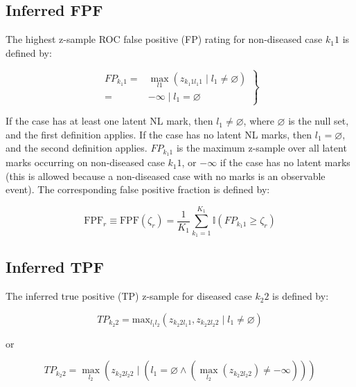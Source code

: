\documentclass[
]{book}
\begin{document}
\hypertarget{inferred-fpf}{%
\subsection{Inferred FPF}\label{inferred-fpf}}

The highest z-sample ROC false positive (FP) rating for non-diseased case \(k_1 1\) is defined by:

\begin{equation}
\left.
\begin{aligned}
FP_{k_1 1}=&\max_{l1} \left ( z_{k_1 1 l_1 1 } \mid l_1 \neq \varnothing \right ) \\
=& -\infty \mid l_1 = \varnothing  
 \end{aligned}
\right \}
\label{eq:empirical-FP}
\end{equation}

If the case has at least one latent NL mark, then \(l_1 \neq \varnothing\), where \(\varnothing\) is the null set, and the first definition applies. If the case has no latent NL marks, then \(l_1 = \varnothing\), and the second definition applies. \(FP_{k_1 1}\) is the maximum z-sample over all latent marks occurring on non-diseased case \(k_1 1\), or \(-\infty\) if the case has no latent marks (this is allowed because a non-diseased case with no marks is an observable event). The corresponding false positive fraction is defined by:

\begin{equation}
\text{FPF}_r \equiv \text{FPF} \left ( \zeta_r \right ) = \frac{1}{K_1} \sum_{k_1=1}^{K_1} \mathbb{I} \left ( FP_{k_1 1} \geq \zeta_r\right )
\label{eq:empirical-fpf}
\end{equation}

\hypertarget{inferred-tpf}{%
\subsection{Inferred TPF}\label{inferred-tpf}}

The inferred true positive (TP) z-sample for diseased case \(k_2 2\) is defined by:

\begin{equation}
TP_{k_2 2} = \text{max}_{l_1 l_2}\left ( z_{k_2 2 l_1 1} ,z_{k_2 2 l_2 2} \mid l_1 \neq \varnothing \right )
\label{eq:empirical-TP1}
\end{equation}

or

\begin{equation}
TP_{k_2 2} = \max_{l_2}  \left ( z_{k_2 2 l_2 2} \mid\left ( l_1 = \varnothing \land \left (\max_{l_2}{\left (z_{k_2 2 l_2 2}  \right )} \neq -\infty  \right )  \right ) \right ) 
\label{eq:empirical-TP2}
\end{equation}
\end{document}
